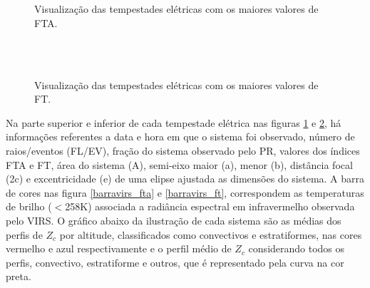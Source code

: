 \begin{figure}[!hb]
  \centering  
  \\
   \\
  \caption{Visualização das tempestades elétricas com os maiores valores de FTA.} %
\label{topFTA}
\end{figure}

\begin{figure}[!hb]
  \centering 
  \\
   \\
  \caption{Visualização das tempestades elétricas com os maiores valores de FT.} %
\label{topFT}
\end{figure}

Na parte superior e inferior de cada tempestade elétrica nas figuras \ref{topFTA} e \ref{topFT}, há informações referentes a data e hora em que o sistema foi observado, número de raios/eventos (FL/EV), fração do sistema observado pelo PR, valores dos índices FTA e FT, área do sistema (A), semi-eixo maior (a), menor (b), distância focal (2c) e excentricidade (e) de uma elipse ajustada as dimensões do sistema. A barra de cores nas figura \ref{barravirs_fta} e \ref{barravirs_ft}, correspondem as temperaturas de brilho ($<$258K) associada a radiância espectral em infravermelho observada pelo VIRS. O gráfico abaixo da ilustração de cada sistema são as médias dos perfis de $Z_c$ por altitude, classificados como convectivos e estratiformes, nas cores vermelho e azul respectivamente e o perfil médio de $Z_c$ considerando todos os perfis, convectivo, estratiforme e outros, que é representado pela curva na cor preta.


